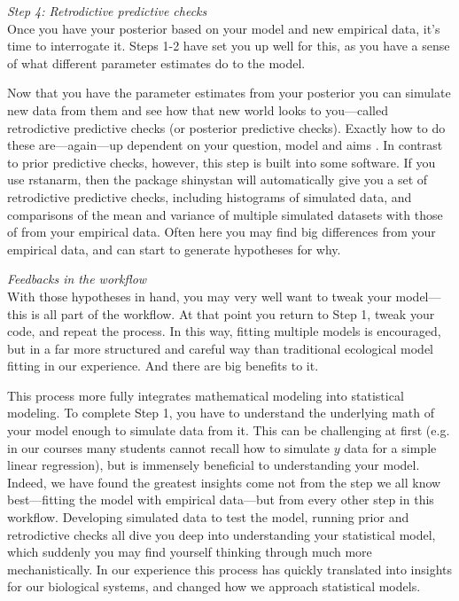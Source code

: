 \documentclass[11pt]{article}
\begin{document}
 \emph{Step 4: Retrodictive predictive checks} \\
Once you have your posterior based on your model and new empirical data, it's time to interrogate it. Steps 1-2 have set you up well for this, as you have a sense of what different parameter estimates do to the model. 

Now that you have the parameter estimates from your posterior you can simulate new data from them and see how that new world looks to you---called retrodictive predictive checks (or posterior predictive checks). Exactly how to do these are---again---up dependent on your question, model and aims \citep[but again, there is lots written on this,][]{held2010,gelman200ppc,conn2018}. In contrast to prior predictive checks, however, this step is built into some software. If you use \textsf{rstanarm}, then the package \textsf{shinystan} will automatically give you a set of retrodictive predictive checks, including histograms of simulated data, and comparisons of the mean and variance of multiple simulated datasets with those of from your empirical data. Often here you may find big differences from your empirical data, and can start to generate hypotheses for why.

\emph{Feedbacks in the workflow}\\
With those hypotheses in hand, you may very well want to tweak your model---this is all part of the workflow. At that point you return to Step 1, tweak your code, and repeat the process. In this way, fitting multiple models is encouraged, but in a far more structured and careful way than traditional ecological model fitting in our experience. And there are big benefits to it. 

This process more fully integrates mathematical modeling into statistical modeling. To complete Step 1, you have to understand the underlying math of your model enough to simulate data from it. This can be challenging at first (e.g. in our courses many students cannot recall how to simulate $y$ data for a simple linear regression), but is immensely beneficial to understanding your model. Indeed, we have found the greatest insights come not from the step we all know best---fitting the model with empirical data---but from every other step in this workflow. Developing simulated data to test the model, running prior and retrodictive checks all dive you deep into understanding your statistical model, which suddenly you may find yourself thinking through much more mechanistically. In our experience this process has quickly translated into insights for our biological systems, and changed how we approach statistical models. 
\end{document}
